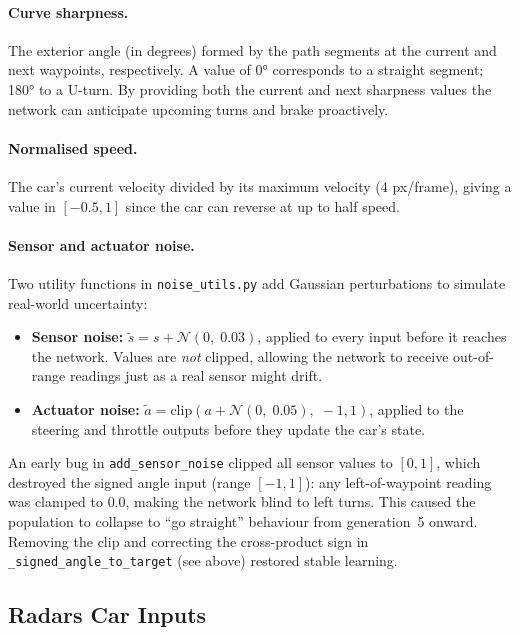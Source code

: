 \documentclass[a4paper]{article}
\begin{document}
\paragraph{Curve sharpness.}
The exterior angle (in degrees) formed by the path segments at the current and next
waypoints, respectively.
A value of 0° corresponds to a straight segment; 180° to a U-turn.
By providing both the current and next sharpness values the network can anticipate
upcoming turns and brake proactively.

\paragraph{Normalised speed.}
The car's current velocity divided by its maximum velocity (4 px/frame), giving a
value in $[-0.5, 1]$ since the car can reverse at up to half speed.

\paragraph{Sensor and actuator noise.}
Two utility functions in \texttt{noise\_utils.py} add Gaussian perturbations to
simulate real-world uncertainty:
\begin{itemize}
    \item \textbf{Sensor noise:} $\tilde{s} = s + \mathcal{N}(0,\; 0.03)$,
          applied to every input before it reaches the network.
          Values are \emph{not} clipped, allowing the network to receive
          out-of-range readings just as a real sensor might drift.
    \item \textbf{Actuator noise:} $\tilde{a} = \text{clip}(a + \mathcal{N}(0,\; 0.05),\;
          -1, 1)$, applied to the steering and throttle outputs before they
          update the car's state.
\end{itemize}

An early bug in \texttt{add\_sensor\_noise} clipped all sensor values to $[0,1]$,
which destroyed the signed angle input (range $[-1,1]$): any left-of-waypoint
reading was clamped to $0.0$, making the network blind to left turns.
This caused the population to collapse to ``go straight'' behaviour from
generation~5 onward.
Removing the clip and correcting the cross-product sign in
\texttt{\_signed\_angle\_to\_target} (see above) restored stable learning.


\subsection{Radars Car Inputs}
\label{subsec:radars-car-inputs}
\end{document}
